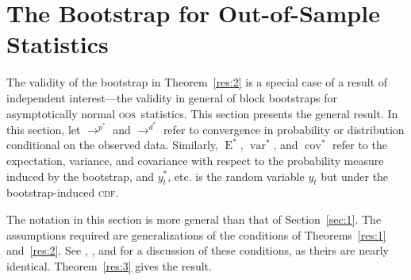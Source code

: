 \documentclass[11pt,fleqn]{article}
\theoremstyle{definition}
\DeclareMathOperator{\E}{E}
\DeclareMathOperator{\var}{var}
\DeclareMathOperator{\cov}{cov}
\newcommand{\cdf}{\textsc{cdf}}
\newcommand{\oos}{\textsc{oos}}
\begin{document}
\section{The Bootstrap for Out-of-Sample Statistics}\label{sec:1b}
The validity of the bootstrap in Theorem~\ref{res:2} is a special case
of a result of independent interest---the validity in general of block
bootstraps for asymptotically normal \oos\ statistics.  This section
presents the general result.  In this section, let $\to^{p^{*}}$ and
$\to^{d^{*}}$ refer to convergence in probability or distribution
conditional on the observed data.  Similarly, $\E^{*}$, $\var^{*}$,
and $\cov^{*}$ refer to the expectation, variance, and covariance with
respect to the probability measure induced by the bootstrap, and
$y_t^{*}$, etc. is the random variable $y_t$ but under the
bootstrap-induced \cdf.

The notation in this section is more general than that of
Section~\ref{sec:1}.  The assumptions required are generalizations of
the conditions of Theorems~\ref{res:1} and~\ref{res:2}.  See
\citet{Wes:96,Wes:06}, \citet{WeM:98}, and \citet{Mcc:00} for a
discussion of these conditions, as theirs are nearly identical.
Theorem~\ref{res:3} gives the result.
\end{document}
